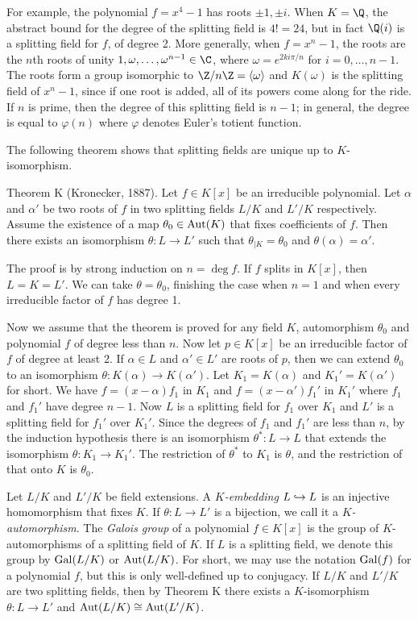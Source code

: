 For example, the polynomial $f = x^4 - 1$ has roots $\pm 1, \pm i$. When $K = \Q$, the abstract bound for the degree of the splitting field is $4! = 24$, but in fact $\Q(i)$ is a splitting field for $f$, of degree 2. More generally, when $f = x^n - 1$, the roots are the $n$th roots of unity $1, \omega, \ldots, \omega^{n-1} \in\C$, where $\omega = e^{2ki\pi/n}$ for $i = 0,\ldots,n-1$. The roots form a group isomorphic to $\Z/n\Z = \langle\omega\rangle$ and $K(\omega)$ is the splitting field of $x^n - 1$, since if one root is added, all of its powers come along for the ride. If $n$ is prime, then the degree of this splitting field is $n-1$; in general, the degree is equal to $\varphi(n)$ where $\varphi$ denotes Euler's totient function.

The following theorem shows that splitting fields are unique up to $K$-isomorphism.

\parenproclaim Theorem K (Kronecker{\rm, 1887}). Let $f\in K[x]$ be an irreducible polynomial. Let $\alpha$ and $\alpha'$ be two roots of $f$ in two splitting fields $L/K$ and $L'/K$ respectively. Assume the existence of a map $\theta_0 \in \mathop {\rm Aut}(K)$ that fixes coefficients of $f$. Then there exists an isomorphism $\theta : L \to L'$ such that $\theta_{|K} = \theta_0$ and $\theta(\alpha) = \alpha'$.

\proof The proof is by strong induction on $n = \deg f$. If $f$ splits in $K[x]$, then $L = K = L'$. We can take $\theta = \theta_0$, finishing the case when $n=1$ and when every irreducible factor of $f$ has degree 1.

Now we assume that the theorem is proved for any field $K$, automorphism $\theta_0$ and polynomial $f$ of degree less than $n$. Now let $p\in K[x]$ be an irreducible factor of $f$ of degree at least 2. If $\alpha\in L$ and $\alpha'\in L'$ are roots of $p$, then we can extend $\theta_0$ to an isomorphism $\theta : K(\alpha) \to K(\alpha')$. Let $K_1 = K(\alpha)$ and ${K_1}' = K(\alpha')$ for short. We have $f = (x-\alpha)f_1$ in $K_1$ and $f = (x-\alpha'){f_1}'$ in ${K_1}'$ where $f_1$ and ${f_1}'$ have degree $n-1$. Now $L$ is a splitting field for $f_1$ over $K_1$ and $L'$ is a splitting field for ${f_1}'$ over ${K_1}'$. Since the degrees of $f_1$ and ${f_1}'$ are less than $n$, by the induction hypothesis there is an isomorphism $\theta^* : L \to L$ that extends the isomorphism $\theta : K_1 \to {K_1}'$. The restriction of $\theta^*$ to $K_1$ is $\theta$, and the restriction of that onto $K$ is $\theta_0$.\slug

Let $L/K$ and $L'/K$ be field extensions. A {\it $K$-embedding} $L \hookrightarrow L$ is an injective homomorphism that fixes $K$. If $\theta : L\to L'$ is a bijection, we call it a {\it $K$-automorphism}. The {\it Galois group} of a polynomial $f\in K[x]$ is the group of $K$-automorphisms of a splitting field of $K$. If $L$ is a splitting field, we denote this group by $\mathop {\rm Gal}(L/K)$ or $\mathop {\rm Aut}(L/K)$. For short, we may use the notation $\mathop {\rm Gal}(f)$ for a polynomial $f$, but this is only well-defined up to conjugacy. If $L/K$ and $L'/K$ are two splitting fields, then by Theorem K there exists a $K$-isomorphism $\theta:L\to L'$ and $\mathop {\rm Aut}(L/K) \cong \mathop {\rm Aut}(L'/K)$.

